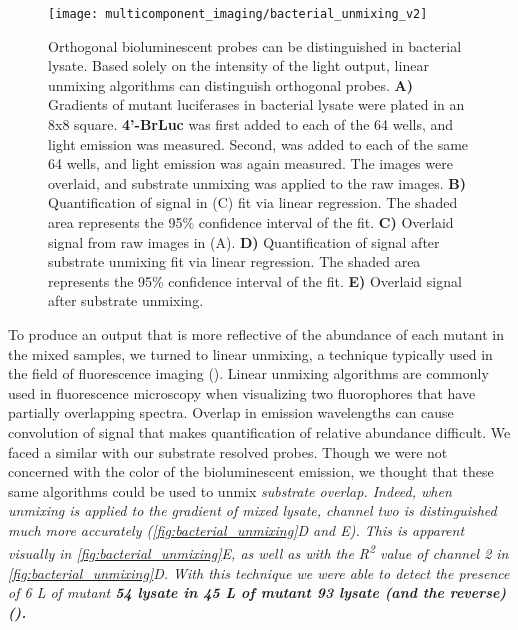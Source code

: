 \begin{figure}[htbp]
\texttt{[image: multicomponent\_imaging/bacterial\_unmixing\_v2]}
\centering
\caption[Orthogonal bioluminescent probes can be distinguished in bacterial lysate]{
Orthogonal bioluminescent probes can be distinguished in bacterial lysate. Based solely on the intensity of the light output, linear unmixing algorithms can distinguish orthogonal probes. \textbf{A)} Gradients of mutant luciferases in bacterial lysate were plated in an 8x8 square. \textbf{4'-BrLuc} was first added to each of the 64 wells, and light emission was measured. Second, \dluc{} was added to each of the same 64 wells, and light emission was again measured. The images were overlaid, and substrate unmixing was applied to the raw images. \textbf{B)} Quantification of signal in (C) fit via linear regression. The shaded area represents the 95\% confidence interval of the fit. \textbf{C)} Overlaid signal from raw images in (A). \textbf{D)} Quantification of signal after substrate unmixing fit via linear regression. The shaded area represents the 95\% confidence interval of the fit. \textbf{E)} Overlaid signal after substrate unmixing.
}
  \label{fig:bacterial_unmixing}
\end{figure}

To produce an output that is more reflective of the abundance of each mutant in the mixed samples, we turned to linear unmixing, a technique typically used in the field of fluorescence imaging (). Linear unmixing algorithms are commonly used in fluorescence microscopy when visualizing two fluorophores that have partially overlapping spectra. Overlap in emission wavelengths can cause convolution of signal that makes quantification of relative abundance difficult. We faced a similar with our substrate resolved probes. Though we were not concerned with the color of the bioluminescent emission, we thought that these same algorithms could be used to unmix \it{substrate} overlap. Indeed, when unmixing is applied to the gradient of mixed lysate, channel two is distinguished much more accurately (\autoref{fig:bacterial_unmixing}D and E). This is apparent visually in \autoref{fig:bacterial_unmixing}E, as well as with the R\textsuperscript{2} value of channel 2 in \autoref{fig:bacterial_unmixing}D.
With this technique we were able to detect the presence of 6 \textmu{}L of mutant \bf{54} lysate in 45 \textmu{}L of mutant \bf{93} lysate (and the reverse) ().

